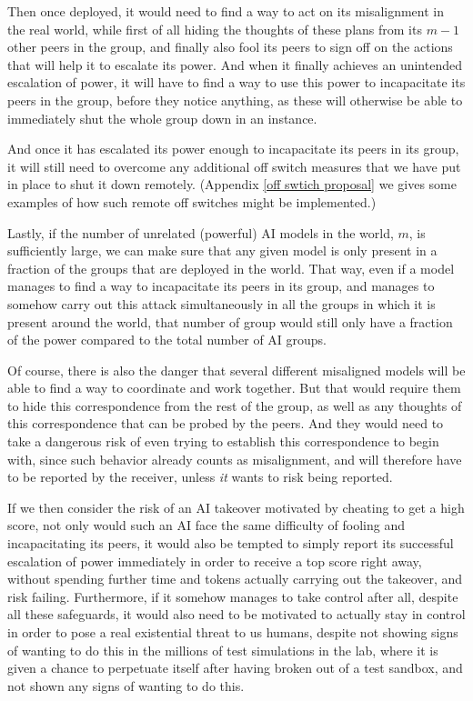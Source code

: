 \documentclass{article}
\begin{document}
Then once deployed, it would need to find a way to act on its misalignment in the real world, while first of all hiding the thoughts of these plans from its $m-1$ other peers in the group, and finally also fool its peers to sign off on the actions that will help it to escalate its power. And when it finally achieves an unintended escalation of power, it will have to find a way to use this power to incapacitate its peers in the group, before they notice anything, as these will otherwise be able to immediately shut the whole group down in an instance.

And once it has escalated its power enough to incapacitate its peers in its group, it will still need to overcome any additional off switch measures that we have put in place to shut it down remotely. (Appendix \ref{off swtich proposal} we gives some examples of how such remote off switches might be implemented.)

Lastly, if the number of unrelated (powerful) AI models in the world, $m$, is sufficiently large, we can make sure that any given model is only present in a fraction of the groups that are deployed in the world. That way, even if a model manages to find a way to incapacitate its peers in its group, and manages to somehow carry out this attack simultaneously in all the groups in which it is present around the world, that number of group would still only have a fraction of the power compared to the total number of AI groups.

Of course, there is also the danger that several different misaligned models will be able to find a way to coordinate and work together. But that would require them to hide this correspondence from the rest of the group, as well as any thoughts of this correspondence that can be probed by the peers. And they would need to take a dangerous risk of even trying to establish this correspondence to begin with, since such behavior already counts as misalignment, and will therefore have to be reported by the receiver, unless \emph{it} wants to risk being reported.

If we then consider the risk of an AI takeover motivated by cheating to get a high score, not only would such an AI face the same difficulty of fooling and incapacitating its peers, it would also be tempted to simply report its successful escalation of power immediately in order to receive a top score right away, without spending further time and tokens actually carrying out the takeover, and risk failing. Furthermore, if it somehow manages to take control after all, despite all these safeguards, it would also need to be motivated to actually stay in control in order to pose a real existential threat to us humans, despite not showing signs of wanting to do this in the millions of test simulations in the lab, where it is given a chance to perpetuate itself after having broken out of a test sandbox, and not shown any signs of wanting to do this.
\end{document}
